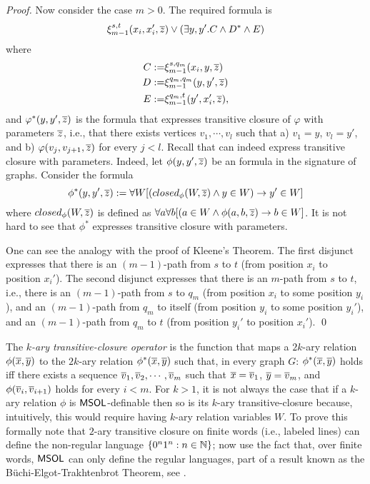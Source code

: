 \begin{proof}
Now consider the case $m > 0$. The required formula is 
\[
 \xi_{m-1}^{s,t}(x_i,x'_i,\overline{z}) \vee (\exists y,y'. C \wedge D^* \wedge E)
\]
where
\begin{eqnarray*}
C := & \xi_{m-1}^{s,q_m}(x_i,y,\overline{z})\\
D := & \xi_{m-1}^{q_m,q_m}(y,y',\overline{z})\\
E := & \xi_{m-1}^{q_m,t}(y',x_i',\overline{z}),
\end{eqnarray*}
 and $\varphi^*(y,y',\overline{z})$ is the formula that expresses transitive closure of $\varphi$ with parameters $\overline{z}$, i.e., 
 that there exists vertices $v_1, \cdots, v_l$ such that a) $v_1 = y$, $v_l = y'$, and b) $\varphi(v_j,v_{j+1},\overline{z})$ for every $j < l$. 
Recall that \msol can indeed express transitive closure with parameters. Indeed, 
let $\phi(y,y',\overline{z})$ be an \msol formula in the signature of graphs. Consider the \msol formula
\[
\phi^*(y,y',\overline{z}) := \forall W [(closed_{\phi}(W,\overline{z}) \wedge y \in W) \rightarrow y' \in W] 
\]
where $closed_{\phi}(W,\overline{z})$ is defined as $\forall a \forall b[(a \in W \wedge \phi(a,b,\overline{z}) \rightarrow b \in W]$. 
It is not hard to see that $\phi^*$ expresses transitive closure with parameters.

 One can see the analogy with the proof of Kleene's Theorem.
 The first disjunct expresses that there is an $(m-1)$-path from $s$ to $t$ (from position $x_i$ to position $x_i'$). The 
 second disjunct expresses that there is an $m$-path from $s$ to $t$, i.e., 
 there is an $(m-1)$-path from $s$ to $q_m$ (from position $x_i$ to some position $y_i$), 
 and an $(m-1)$-path from $q_m$ to itself (from position $y_i$ to some position $y_i'$), 
 and an $(m-1)$-path from $q_m$ to $t$ (from position $y_i'$ to position $x_i'$).
\qed
\end{proof}

 
\begin{remark}
The {\em $k$-ary transitive-closure operator} is the function that maps a $2k$-ary relation $\phi(\overline{x},\overline{y})$ to the $2k$-ary relation $\phi^*(\overline{x},\overline{y})$ such that, in every graph $G$: $\phi^*(\overline{x},\overline{y})$ holds iff there exists a sequence $\overline{v}_1, \overline{v}_2, \cdots, \overline{v}_m$ such that $\overline{x} = \overline{v}_1$, $\overline{y} = \overline{v}_m$, and $\phi(\overline{v}_i,\overline{v}_{i+1})$ holds for every $i < m$. 
For $k > 1$, it is not always the case that if a $k$-ary relation $\phi$ is $\mathsf{MSOL}$-definable then so is its $k$-ary transitive-closure because, intuitively, this would require having $k$-ary relation variables $W$.  To prove this formally note that $2$-ary transitive closure on finite words (i.e., labeled lines) can define the non-regular language $\{0^n1^n : n \in \mathbb{N}\}$; now use the fact that, over finite words, $\mathsf{MSOL}$ can only define the regular languages, part of a result known as the B\"uchi-Elgot-Trakhtenbrot Theorem, see \cite{Thomas96}.
\end{remark}

